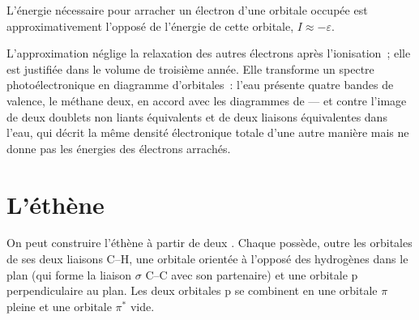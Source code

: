 \begin{proposition}\label{prop:b2:fragment-orbitals:koopmans}
L'énergie nécessaire pour arracher un électron d'une orbitale occupée est
approximativement l'opposé de l'énergie de cette orbitale, $I \approx -\varepsilon$.
\end{proposition}

\admitted

L'approximation néglige la relaxation des autres électrons après
l'ionisation~; elle est justifiée dans le volume de troisième année. Elle transforme un spectre
photoélectronique en diagramme d'orbitales~: l'eau présente quatre bandes de valence, le méthane deux,
en accord avec les diagrammes de  --- et contre l'image de deux doublets non liants
équivalents et de deux liaisons équivalentes dans l'eau, qui décrit la même densité électronique
totale d'une autre manière mais ne donne pas les énergies des
électrons arrachés.

\section{L'éthène}

On peut construire l'éthène à partir de deux  . Chaque  possède, outre les
orbitales de ses deux liaisons C--H, une orbitale orientée à l'opposé des hydrogènes dans le
plan (qui forme la liaison $\sigma$ C--C avec son partenaire) et une orbitale p
perpendiculaire au plan. Les deux orbitales p se combinent en une orbitale $\pi$ pleine et une
orbitale $\pi^*$ vide.

